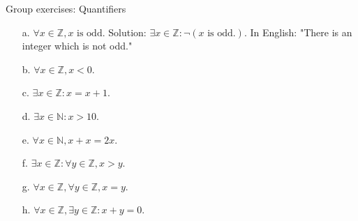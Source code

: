 \documentclass[10pt]{beamer}
\begin{document}
\begin{frame}{Group exercises: Quantifiers}
\begin{minipage}{0.38\textwidth}
\begin{itemize}
        \item[a.] $\forall x \in \mathbb{Z}, x \text{ is odd.} $  \alert{Solution: $\exists x \in \mathbb{Z}: \lnot (x \text{ is odd}.)$. In English: "There is an integer which is not odd."}
        \item[b.] $\forall x \in \mathbb{Z}, x<0.$ 
        \item[c.] $\exists x \in \mathbb{Z}: x=x+1.$
        \item[d.] $\exists x \in \mathbb{N}: x>10.$
        \item[e.] $\forall x \in \mathbb{N}, x+x=2x.$
        \item[f.] $\exists x \in \mathbb{Z}: \forall y \in \mathbb{Z}, x>y.$
        \item[g.]  $\forall x \in \mathbb{Z}, \forall y \in \mathbb{Z}, x=y.$
        \item[h.] $\forall x \in \mathbb{Z}, \exists y \in \mathbb{Z}: x+y=0.$
    \end{itemize}
\end{minipage}

\end{frame}
\end{document}
